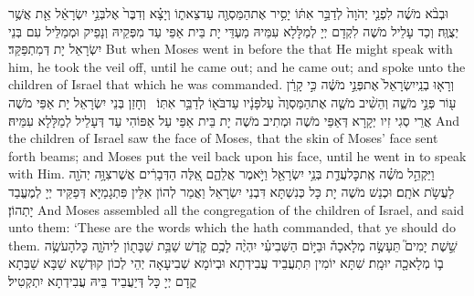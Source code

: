 {וּבְבֹ֨א מֹשֶׁ֜ה לִפְנֵ֤י יְהֹוָה֙ לְדַבֵּ֣ר אִתּ֔וֹ יָסִ֥יר אֶת\maqqaf הַמַּסְוֶ֖ה עַד\maqqaf צֵאת֑וֹ וְיָצָ֗א וְדִבֶּר֙ אֶל\maqqaf בְּנֵ֣י יִשְׂרָאֵ֔ל אֵ֖ת אֲשֶׁ֥ר יְצֻוֶּֽה׃}
{וְכַד עָלֵיל מֹשֶׁה לִקְדָם יְיָ לְמַלָּלָא עִמֵּיהּ מַעְדֵּי יָת בֵּית אַפֵּי עַד מִפְּקֵיהּ וְנָפֵיק וּמְמַלֵּיל עִם בְּנֵי יִשְׂרָאֵל יָת דְּמִתְפַּקַּד׃}
{But when Moses went in before the \lord\space that He might speak with him, he took the veil off, until he came out; and he came out; and spoke unto the children of Israel that which he was commanded.}{}
{וְרָא֤וּ בְנֵֽי\maqqaf יִשְׂרָאֵל֙ אֶת\maqqaf פְּנֵ֣י מֹשֶׁ֔ה כִּ֣י קָרַ֔ן ע֖וֹר פְּנֵ֣י מֹשֶׁ֑ה וְהֵשִׁ֨יב מֹשֶׁ֤ה אֶת\maqqaf הַמַּסְוֶה֙ עַל\maqqaf פָּנָ֔יו עַד\maqqaf בֹּא֖וֹ לְדַבֵּ֥ר אִתּֽוֹ׃ \setuma }
{וְחָזַן בְּנֵי יִשְׂרָאֵל יָת אַפֵּי מֹשֶׁה אֲרֵי סְגִי זִיו יְקָרָא דְּאַפֵּי מֹשֶׁה וּמְתִיב מֹשֶׁה יָת בֵּית אַפֵּי עַל אַפּוֹהִי עַד דְּעָלֵיל לְמַלָּלָא עִמֵּיהּ׃}
{And the children of Israel saw the face of Moses, that the skin of Moses’ face sent forth beams; and Moses put the veil back upon his face, until he went in to speak with Him.}{}
\newperek
{}
{וַיַּקְהֵ֣ל מֹשֶׁ֗ה אֶֽת\maqqaf כׇּל\maqqaf עֲדַ֛ת בְּנֵ֥י יִשְׂרָאֵ֖ל וַיֹּ֣אמֶר אֲלֵהֶ֑ם אֵ֚לֶּה הַדְּבָרִ֔ים אֲשֶׁר\maqqaf צִוָּ֥ה יְהֹוָ֖ה לַעֲשֹׂ֥ת אֹתָֽם׃}
{וּכְנַשׁ מֹשֶׁה יָת כָּל כְּנִשְׁתָּא דִּבְנֵי יִשְׂרָאֵל וַאֲמַר לְהוֹן אִלֵּין פִּתְגָמַיָּא דְּפַקֵּיד יְיָ לְמֶעֱבַד יָתְהוֹן׃}
{And Moses assembled all the congregation of the children of Israel, and said unto them: ‘These are the words which the \lord\space hath commanded, that ye should do them.}{}
{שֵׁ֣שֶׁת יָמִים֮ תֵּעָשֶׂ֣ה מְלָאכָה֒ וּבַיּ֣וֹם הַשְּׁבִיעִ֗י יִהְיֶ֨ה לָכֶ֥ם קֹ֛דֶשׁ שַׁבַּ֥ת שַׁבָּת֖וֹן לַיהֹוָ֑ה כׇּל\maqqaf הָעֹשֶׂ֥ה ב֛וֹ מְלָאכָ֖ה יוּמָֽת׃}
{שִׁתָּא יוֹמִין תִּתְעֲבֵיד עֲבִידְתָא וּבְיוֹמָא שְׁבִיעָאָה יְהֵי לְכוֹן קוּדְשָׁא שַׁבָּא שַׁבְּתָא קֳדָם יְיָ כָּל דְּיַעֲבֵיד בֵּיהּ עֲבִידְתָא יִתְקְטִיל׃}
